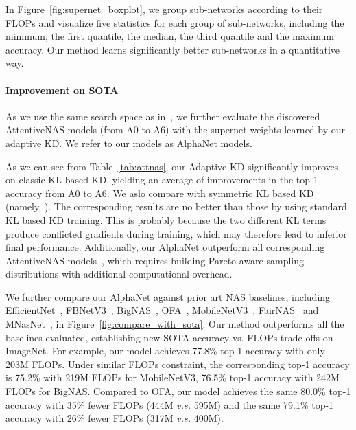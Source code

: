 \documentclass{article}
\begin{document}
In Figure~\ref{fig:supernet_boxplot}, we group sub-networks according to their FLOPs and visualize five statistics for each group of sub-networks, including the minimum, the first quantile, the median, the third quantile and the maximum accuracy. Our method learns significantly better sub-networks in a quantitative way.


\paragraph{Improvement on SOTA}
As we use the same search space as in~\citet{wang2020attentivenas},
we further evaluate the discovered AttentiveNAS models (from A0 to A6)
with the supernet weights learned by our adaptive KD.
We refer to our models as AlphaNet models. 

As we can see from  Table~\ref{tab:attnas}, 
our Adaptive-KD significantly improves on classic KL based KD, yielding 
an average of  improvements in the top-1 accuracy from A0 to A6. 
We aslo compare with symmetric KL based KD (namely, ). The corresponding results are no
better than those by using standard KL based KD training.
This is probably because the two different KL terms produce
conflicted gradients during training, which may therefore
lead to inferior final performance.
Additionally, our AlphaNet outperform all corresponding AttentiveNAS models~\citep{wang2020attentivenas}, which requires building Pareto-aware sampling distributions with additional computational overhead.  


We further compare our AlphaNet against prior art NAS baselines, including  EfficientNet~\citep{tan2019efficientnet}, FBNetV3~\citep{dai2020fbnetv3}, BigNAS~\citep{yu2020bignas}, OFA~\citep{cai2019once}, MobileNetV3~\citep{howard2019searching}, FairNAS~\citep{chu2019fairnas} and  MNasNet~\citep{tan2019mnasnet}, in Figure~\ref{fig:compare_with_sota}. 
Our method outperforms all the baselines evaluated, establishing new SOTA accuracy vs. FLOPs trade-offs on ImageNet. 
For example, our model achieves 77.8\% top-1 accuracy with only 203M FLOPs. Under similar FLOPs constraint, the  corresponding top-1 accuracy is 75.2\%  with 219M FLOPs for MobileNetV3, 76.5\% top-1 accuracy with 242M FLOPs for BigNAS. 
Compared to OFA, our model achieves the same 80.0\% top-1 accuracy with 35\% fewer FLOPs (444M \emph{v.s.} 595M) and the same 79.1\% top-1 accuracy with  26\% fewer FLOPs (317M \emph{v.s.} 400M).
\end{document}
